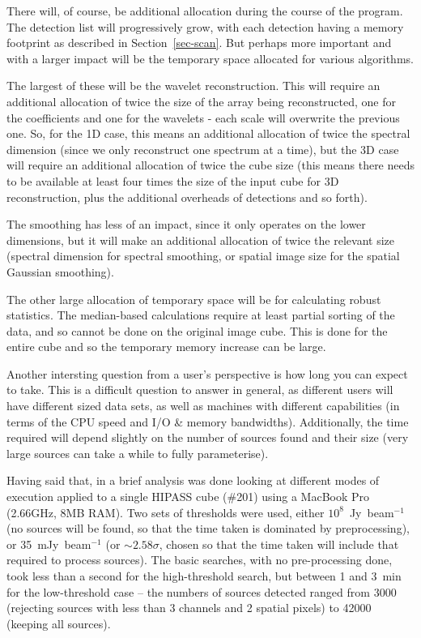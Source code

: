 There will, of course, be additional allocation during the course of
the program. The detection list will progressively grow, with each
detection having a memory footprint as described in
Section~\ref{sec-scan}. But perhaps more important and with a larger
impact will be the temporary space allocated for various algorithms.

The largest of these will be the wavelet reconstruction. This will
require an additional allocation of twice the size of the array being
reconstructed, one for the coefficients and one for the wavelets -
each scale will overwrite the previous one. So, for the 1D case, this
means an additional allocation of twice the spectral dimension (since
we only reconstruct one spectrum at a time), but the 3D case will
require an additional allocation of twice the cube size (this means
there needs to be available at least four times the size of the input
cube for 3D reconstruction, plus the additional overheads of
detections and so forth).

The smoothing has less of an impact, since it only operates on the
lower dimensions, but it will make an additional allocation of twice
the relevant size (spectral dimension for spectral smoothing, or
spatial image size for the spatial Gaussian smoothing).

The other large allocation of temporary space will be for calculating
robust statistics. The median-based calculations require at least
partial sorting of the data, and so cannot be done on the original
image cube. This is done for the entire cube and so the temporary
memory increase can be large.



Another intersting question from a user's perspective is how long you
can expect \duchamp to take. This is a difficult question to answer in
general, as different users will have different sized data sets, as
well as machines with different capabilities (in terms of the CPU
speed and I/O \& memory bandwidths). Additionally, the time required
will depend slightly on the number of sources found and their size
(very large sources can take a while to fully parameterise). 

Having said that, in \citet{whiting12} a brief analysis was done
looking at different modes of execution applied to a single HIPASS
cube (\#201) using a MacBook Pro (2.66GHz, 8MB RAM). Two sets of
thresholds were used, either $10^8$~Jy~beam$^{-1}$ (no sources will be
found, so that the time taken is dominated by preprocessing), or
35~mJy~beam$^{-1}$ (or $\sim2.58\sigma$, chosen so that the time taken
will include that required to process sources).  The basic searches,
with no pre-processing done, took less than a second for the
high-threshold search, but between 1 and 3~min for the low-threshold
case -- the numbers of sources detected ranged from 3000 (rejecting
sources with less than 3 channels and 2 spatial pixels) to 42000
(keeping all sources).

